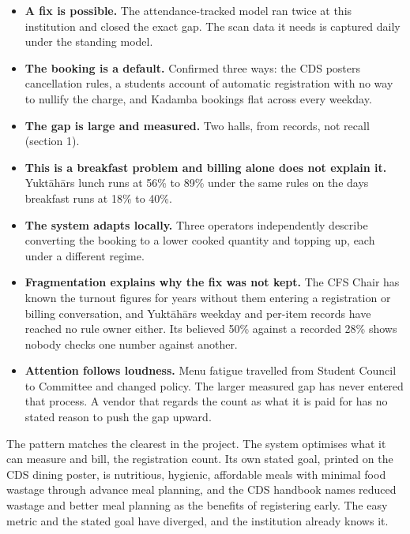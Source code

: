 \documentclass[
  10pt,
  table]{article}
\providecommand{\tightlist}{%
  \setlength{\itemsep}{0pt}\setlength{\parskip}{0pt}}
\renewcommand{\tightlist}{\setlength{\itemsep}{1.5pt}\setlength{\parskip}{0pt}}
\begin{document}
\begin{itemize}
\tightlist
\item
  \textbf{A fix is possible.} The attendance-tracked model ran twice at this institution and closed the exact gap. The scan data it needs is captured daily under the standing model.
\item
  \textbf{The booking is a default.} Confirmed three ways: the CDS poster\textquotesingle s cancellation rules, a student\textquotesingle s account of automatic registration with no way to nullify the charge, and Kadamba bookings flat across every weekday.
\item
  \textbf{The gap is large and measured.} Two halls, from records, not recall (section 1).
\item
  \textbf{This is a breakfast problem and billing alone does not explain it.} Yuktāhār\textquotesingle s lunch runs at 56\% to 89\% under the same rules on the days breakfast runs at 18\% to 40\%.
\item
  \textbf{The system adapts locally.} Three operators independently describe converting the booking to a lower cooked quantity and topping up, each under a different regime.
\item
  \textbf{Fragmentation explains why the fix was not kept.} The CFS Chair has known the turnout figures for years without them entering a registration or billing conversation, and Yuktāhār\textquotesingle s weekday and per-item records have reached no rule owner either. Its believed 50\% against a recorded 28\% shows nobody checks one number against another.
\item
  \textbf{Attention follows loudness.} Menu fatigue travelled from Student Council to Committee and changed policy. The larger measured gap has never entered that process. A vendor that regards the count as what it is paid for has no stated reason to push the gap upward.
\end{itemize}

The pattern matches the clearest in the project. The system optimises what it can measure and bill, the registration count. Its own stated goal, printed on the CDS dining poster, is nutritious, hygienic, affordable meals with minimal food wastage through advance meal planning, and the CDS handbook names reduced wastage and better meal planning as the benefits of registering early. The easy metric and the stated goal have diverged, and the institution already knows it.
\end{document}
